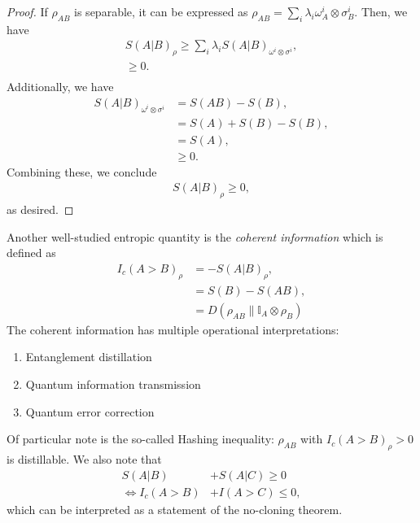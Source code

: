 \documentclass[notoc]{tufte-book}
\begin{document}
\begin{proof}
If $\rho_{AB}$ is separable, it can be expressed as $\rho_{AB}=\sum_i \lambda_i \omega_A^i \otimes \sigma_B^i$. Then, we have
\begin{align}
    S(A|B)_{\rho} \geq \sum_i \lambda_i S(A|B)_{\omega^i \otimes \sigma^i},\\
    \geq 0.\\
\end{align}
Additionally, we have 
\begin{align}
    S(A|B)_{\omega^i \otimes \sigma^i} &= S(AB)-S(B),\\
    &=S(A)+S(B)-S(B),\\
    &=S(A),\\
    &\geq 0.
\end{align}
Combining these, we conclude
\begin{align}
    S(A|B)_{\rho} \geq 0,
\end{align}
as desired.
\end{proof}
Another well-studied entropic quantity is the \textit{coherent information} which is defined as
\begin{align}
    I_c (A>B)_{\rho} &= -S(A|B)_{\rho},\\
    &= S(B) - S(AB),\\
    &=D(\rho_{AB} \| \mathbb{I}_A \otimes \rho_B)
\end{align}
The coherent information has multiple operational interpretations:
\begin{enumerate}
    \item Entanglement distillation
    \item Quantum information transmission
    \item Quantum error correction
\end{enumerate}
Of particular note is the so-called Hashing inequality: $\rho_{AB}$ with $I_c (A>B)_{\rho} >0$ is distillable. We also note that 
\begin{align}
    S(A|B) &+ S(A|C) \geq 0\\ \Leftrightarrow I_c(A>B) &+ I(A>C)\leq 0,
\end{align}
which can be interpreted as a statement of the no-cloning theorem. 
\end{document}
